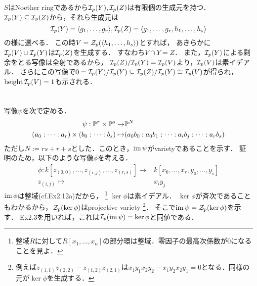 \documentclass[a4paper]{jsarticle}
\begin{document}
    $S$はNoether ringであるから$\mathcal{I}_p(Y), \mathcal{I}_p(Z)$は有限個の生成元を持つ．
    $\mathcal{I}_p(Y) \subseteq \mathcal{I}_p(Z)$から，それら生成元は
    \[ \mathcal{I}_p(Y)=\langle g_1,\dots,g_r \rangle, \mathcal{I}_p(Z)=\langle g_1,\dots,g_r, h_1,\dots,h_s \rangle \]
    の様に選べる．
    この時$V=\mathcal{Z}_p(\langle h_1,\dots,h_s \rangle)$とすれば，
    あきらかに$\mathcal{I}_p(V) \cup \mathcal{I}_p(Y)$は$\mathcal{I}_p(Z)$を生成する．
    すなわち$V \cap Y=Z$．
    また，$\mathcal{I}_p(Y)$による剰余をとる写像は全射であるから，
    $\mathcal{I}_p(Z)/\mathcal{I}_p(Y)=\mathcal{I}_p(V)$より，$\mathcal{I}_p(V)$は素イデアル．
    さらにこの写像で$0=\mathcal{I}_p(Y)/\mathcal{I}_p(Y) \subseteq \mathcal{I}_p(Z)/\mathcal{I}_p(Y) \cong \mathcal{I}_p(V)$が得られ，
    $\operatorname{height} \mathcal{I}_p(V)=1$も示される．

\section{ } %
    写像$\psi$を次で定める．
    \begin{align*}
        \psi: \mathbb{P}^r \times \mathbb{P}^s \to& \mathbb{P}^N \\
        (a_0: \dots: a_r) \times (b_0: \dots: b_s) \mapsto& (a_0 b_0: a_0 b_1: \dots: a_i b_j: \dots: a_r b_s)
    \end{align*}
    ただし$N:=rs+r+s$とした．このとき，$\operatorname{im} \psi$がvarietyであることを示す．
    証明のため，以下のような写像$\phi$を考える．
    \begin{align*}
        \phi: k[z_{(0,0)}, \dots, z_{(i,j)}, \dots, z_{(r,s)}] \to& k[x_0, \dots, x_r, y_0, \dots, y_s] \\
        z_{(i,j)} \mapsto& x_i y_j
    \end{align*}
    $\operatorname{im} \phi$は整域(cf.Ex2.12a)だから，
    \footnote{整域$R$に対して$R[x_1,\dots,x_n]$の部分環は整域．零因子の最高次係数が0になることを見よ．}
    $\ker \phi$は素イデアル．
    $\ker \phi$が斉次であることもわかるから，$\mathcal{Z}_p(\ker \phi)$はprojective variety
    \footnote{例えば$z_{(1,1)}z_{(2,2)}-z_{(1,2)}z_{(2,1)}$は$x_1y_1x_2y_2-x_1y_2x_2y_1=0$となる．同様の元が$\ker \phi$を生成する．}．
    そこで$\operatorname{im} \psi = \mathcal{Z}_p(\ker \phi)$を示す．
    Ex2.3を用いれば，これは$\mathcal{I}_p(\operatorname{im} \psi) = \ker \phi$と同値である．
\end{document}
